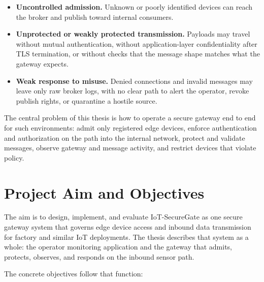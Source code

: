 \documentclass[12pt,a4paper]{report}
\begin{document}
\begin{itemize}
    \item \textbf{Uncontrolled admission.}
    Unknown or poorly identified devices can reach the
    broker and publish toward internal consumers.
    \item \textbf{Unprotected or weakly protected
    transmission.}
    Payloads may travel without mutual authentication,
    without application-layer confidentiality after TLS
    termination, or without checks that the message shape
    matches what the gateway expects.
    \item \textbf{Weak response to misuse.}
    Denied connections and invalid messages may leave only
    raw broker logs, with no clear path to alert the
    operator, revoke publish rights, or quarantine a
    hostile source.
\end{itemize}

The central problem of this thesis is how to operate a
secure gateway end to end for such environments: admit
only registered edge devices, enforce authentication and
authorization on the path into the internal network,
protect and validate messages, observe gateway and message
activity, and restrict devices that violate policy.

\section{Project Aim and Objectives}

The aim is to design, implement, and evaluate
IoT-SecureGate as one secure gateway system that governs
edge device access and inbound data transmission for
factory and similar IoT deployments. The thesis describes
that system as a whole: the operator monitoring
application and the gateway that admits, protects,
observes, and responds on the inbound sensor path.

The concrete objectives follow that function:
\end{document}
